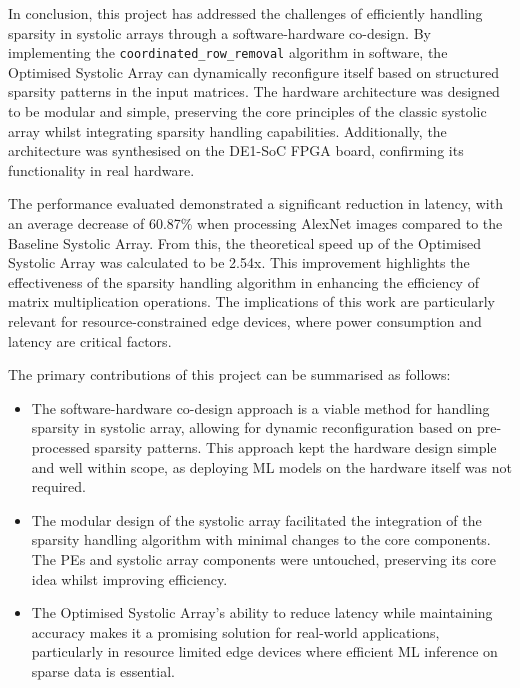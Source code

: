 \documentclass[12pt, a4paper, ukenglish]{article}
\begin{document}
    In conclusion, this project has addressed the challenges of efficiently handling sparsity in systolic arrays through a software-hardware co-design. By implementing the \newline \texttt{coordinated\_row\_removal} algorithm in software, the Optimised Systolic Array can dynamically reconfigure itself based on structured sparsity patterns in the input matrices. The hardware architecture was designed to be modular and simple, preserving the core principles of the classic systolic array whilst integrating sparsity handling capabilities. Additionally, the architecture was synthesised on the DE1-SoC FPGA board, confirming its functionality in real hardware. 

    The performance evaluated demonstrated a significant reduction in latency, with an average decrease of 60.87\% when processing AlexNet images compared to the Baseline Systolic Array. From this, the theoretical speed up of the Optimised Systolic Array was calculated to be 2.54x. This improvement highlights the effectiveness of the sparsity handling algorithm in enhancing the efficiency of matrix multiplication operations. The implications of this work are particularly relevant for resource-constrained edge devices, where power consumption and latency are critical factors. 



    The primary contributions of this project can be summarised as follows:
    \begin{itemize}
        \item The software-hardware co-design approach is a viable method for handling sparsity in systolic array, allowing for dynamic reconfiguration based on pre-processed sparsity patterns. This approach kept the hardware design simple and well within scope, as deploying ML models on the hardware itself was not required.
        \item The modular design of the systolic array facilitated the integration of the sparsity handling algorithm with minimal changes to the core components. The PEs and systolic array components were untouched, preserving its core idea whilst improving efficiency.
        \item The Optimised Systolic Array's ability to reduce latency while maintaining accuracy makes it a promising solution for real-world applications, particularly in resource limited edge devices where efficient ML inference on sparse data is essential.
    \end{itemize}
\end{document}
